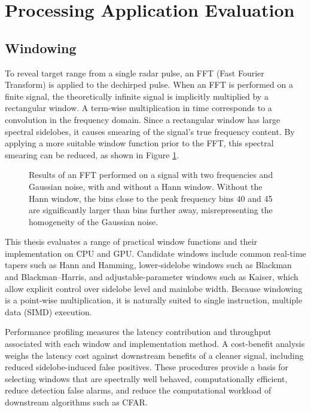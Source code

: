 \section{Processing Application Evaluation}
\label{sec:processing_app}

\subsection{Windowing}
To reveal target range from a single radar pulse, an FFT (Fast Fourier Transform) is applied to the dechirped pulse. When an FFT is performed on a finite signal, the theoretically infinite signal is implicitly multiplied by a rectangular window. A term-wise multiplication in time corresponds to a convolution in the frequency domain. Since a rectangular window has large spectral sidelobes, it causes smearing of the signal's true frequency content. By applying a more suitable window function prior to the FFT, this spectral smearing can be reduced, as shown in Figure \ref{fig:hann filter}.

\begin{figure}[htbp]
    \centering
    
    \caption{Results of an FFT performed on a signal with two frequencies and Gaussian noise, with and without a Hann window. Without the Hann window, the bins close to the peak frequency bins 40 and 45 are significantly larger than bins further away, misrepresenting the homogeneity of the Gaussian noise.}
    \label{fig:hann filter}
\end{figure}

This thesis evaluates a range of practical window functions and their implementation on CPU and GPU. Candidate windows include common real-time tapers such as Hann and Hamming, lower-sidelobe windows such as Blackman and Blackman--Harris, and adjustable-parameter windows such as Kaiser, which allow explicit control over sidelobe level and mainlobe width. Because windowing is a point-wise multiplication, it is naturally suited to single instruction, multiple data (SIMD) execution.

Performance profiling measures the latency contribution and throughput associated with each window and implementation method. A cost-benefit analysis weighs the latency cost against downstream benefits of a cleaner signal, including reduced sidelobe-induced false positives. These procedures provide a basis for selecting windows that are spectrally well behaved, computationally efficient, reduce detection false alarms, and reduce the computational workload of downstream algorithms such as CFAR.

